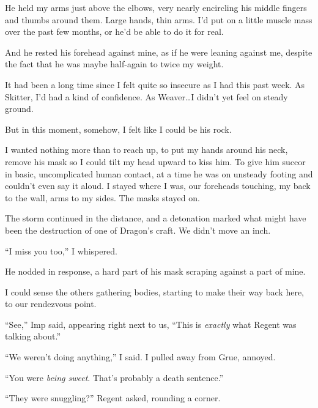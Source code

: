 He held my arms just above the elbows, very nearly encircling his middle fingers and thumbs around them.  Large hands, thin arms.  I'd put on a little muscle mass over the past few months, or he'd be able to do it for real.



And he rested his forehead against mine, as if he were leaning against me, despite the fact that he was maybe half-again to twice my weight.



It had been a long time since I felt quite so insecure as I had this past week.  As Skitter, I'd had a kind of confidence.  As Weaver\ldots I didn't yet feel on steady ground.



But in this moment, somehow, I felt like I could be his rock.



I wanted nothing more than to reach up, to put my hands around his neck, remove his mask so I could tilt my head upward to kiss him.  To give him succor in basic, uncomplicated human contact, at a time he was on unsteady footing and couldn't even say it aloud.  I stayed where I was, our foreheads touching, my back to the wall, arms to my sides.  The masks stayed on.



The storm continued in the distance, and a detonation marked what might have been the destruction of one of Dragon's craft.  We didn't move an inch.



``I miss you too,'' I whispered.



He nodded in response, a hard part of his mask scraping against a part of mine.



I could sense the others gathering bodies, starting to make their way back here, to our rendezvous point.



``See,'' Imp said, appearing right next to us, ``This is \emph{exactly} what Regent was talking about.''



``We weren't doing anything,'' I said.  I pulled away from Grue, annoyed.



``You were \emph{being sweet}.  That's probably a death sentence.''



``They were snuggling?'' Regent asked, rounding a corner.



